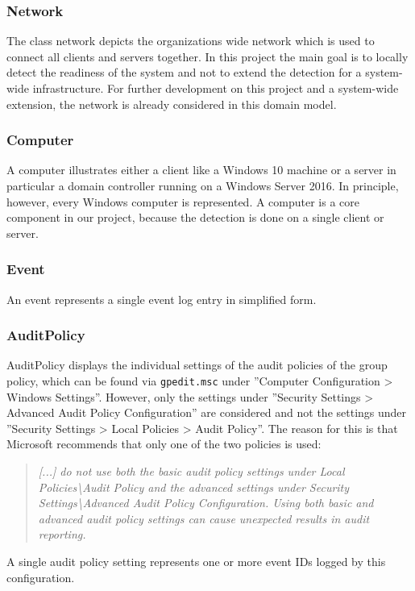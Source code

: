 \subsubsection{Network}
The class network depicts the organizations wide network which is used to connect all clients and servers together. In this project the main goal is to locally detect the readiness of the system and not to extend the detection for a system-wide infrastructure. For further development on this project and a system-wide extension, the network is already considered in this domain model.

\subsubsection{Computer}
A computer illustrates either a client like a Windows 10 machine or a server in particular a domain controller running on a Windows Server 2016. In principle, however, every Windows computer is represented. A computer is a core component in our project, because the detection is done on a single client or server. 

\subsubsection{Event}
An event represents a single event log entry in simplified form.

\subsubsection{AuditPolicy}
AuditPolicy displays the individual settings of the audit policies of the group policy, which can be found via \lstinline|gpedit.msc| under ''Computer Configuration > Windows Settings''. However, only the settings under ''Security Settings > Advanced Audit Policy Configuration'' are considered and not the settings under ''Security Settings > Local Policies > Audit Policy''. The reason for this is that Microsoft recommends that only one of the two policies is used:
\begin{quotation}
    \textit{[...] do not use both the basic audit policy settings under Local Policies\textbackslash Audit Policy and the advanced settings under Security Settings\textbackslash Advanced Audit Policy Configuration. Using both basic and advanced audit policy settings can cause unexpected results in audit reporting.} \cite{AdvancedSecurityAuditing}
\end{quotation}
A single audit policy setting represents one or more event IDs logged by this configuration.

